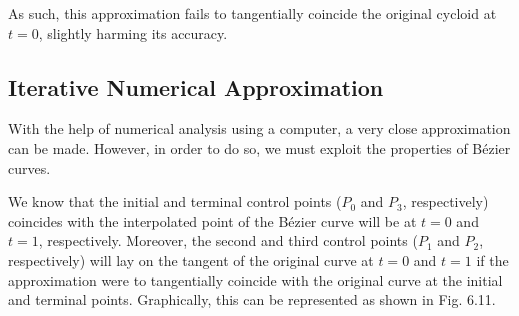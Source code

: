 \documentclass[11pt, oneside, appendixprefix=Appendix]{article}
\theoremstyle{definition}
\newenvironment{equation_nogap} %
{\begin{smallskip} \begin{centering} \begin{spacing}{1.0} $} %
{$ \end{spacing} \end{centering} \end{smallskip}}
\numberwithin{figure}{section}
\begin{document}
As such, this approximation fails to tangentially coincide the original cycloid at $t=0$, slightly harming its accuracy.

%
%
%

\subsection{Iterative Numerical Approximation}

With the help of numerical analysis using a computer, a very close approximation can be made. However, in order to do so, we must exploit the properties of B\'ezier curves.

We know that the initial and terminal control points ($P_0$ and $P_3$, respectively) coincides with the interpolated point of the B\'ezier curve will be at $t=0$ and $t=1$, respectively. Moreover, the second and third control points ($P_1$ and $P_2$, respectively) will lay on the tangent of the original curve at $t=0$ and $t=1$ if the approximation were to tangentially coincide with the original curve at the initial and terminal points. Graphically, this can be represented as shown in Fig. 6.11.
\end{document}
